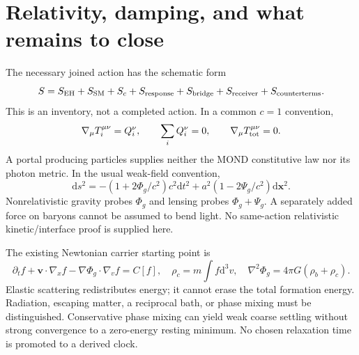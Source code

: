\documentclass[11pt]{article}
\newcommand{\dd}{\mathrm d}
\begin{document}
\section{Relativity, damping, and what remains to close}
The necessary joined action has the schematic form
\begin{equation}
 S=S_{\rm EH}+S_{\rm SM}+S_c+S_{\rm response}
 +S_{\rm bridge}+S_{\rm receiver}+S_{\rm counterterms}.
\end{equation}
This is an inventory, not a completed action. In a common $c=1$ convention,
\begin{equation}
 \nabla_\mu T_i^{\mu\nu}=Q_i^\nu,\qquad \sum_i Q_i^\nu=0,
 \qquad \nabla_\mu T_{\rm tot}^{\mu\nu}=0.
\end{equation}
A portal producing particles supplies neither the MOND constitutive law nor
its photon metric. In the usual weak-field convention,
\begin{equation}
 \dd s^2=-(1+2\Phi_g/c^2)c^2\dd t^2
 +a^2(1-2\Psi_g/c^2)\dd\mathbf x^2.
\end{equation}
Nonrelativistic gravity probes $\Phi_g$ and lensing probes $\Phi_g+\Psi_g$.
A separately added force on baryons cannot be assumed to bend light.
No same-action relativistic kinetic/interface proof is supplied here.

The existing Newtonian carrier starting point is
\begin{equation}
 \partial_t f+\mathbf v\cdot\nabla_x f
 -\nabla\Phi_g\cdot\nabla_v f=C[f],\quad
 \rho_c=m\int f\dd^3v,\quad
 \nabla^2\Phi_g=4\pi G(\rho_b+\rho_c).
\end{equation}
Elastic scattering redistributes energy; it cannot erase the total formation
energy. Radiation, escaping matter, a reciprocal bath, or phase mixing must
be distinguished. Conservative phase mixing can yield weak coarse settling
without strong convergence to a zero-energy resting minimum. No chosen
relaxation time is promoted to a derived clock.
\end{document}
